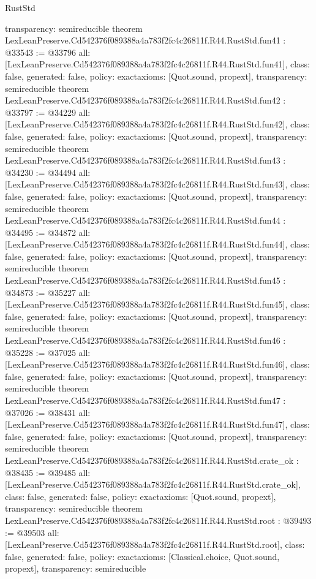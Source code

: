 \begin{lexlean}{RustStd}
\begin{coremodule}
{  transparency: semireducible
}
theorem LexLeanPreserve.Cd542376f089388a4a783f2fc4c26811f.R44.RustStd.fun41 : @33543 := @33796 {
  all: [LexLeanPreserve.Cd542376f089388a4a783f2fc4c26811f.R44.RustStd.fun41],
  class: false,
  generated: false,
  policy: exact{axioms: [Quot.sound, propext]},
  transparency: semireducible
}
theorem LexLeanPreserve.Cd542376f089388a4a783f2fc4c26811f.R44.RustStd.fun42 : @33797 := @34229 {
  all: [LexLeanPreserve.Cd542376f089388a4a783f2fc4c26811f.R44.RustStd.fun42],
  class: false,
  generated: false,
  policy: exact{axioms: [Quot.sound, propext]},
  transparency: semireducible
}
theorem LexLeanPreserve.Cd542376f089388a4a783f2fc4c26811f.R44.RustStd.fun43 : @34230 := @34494 {
  all: [LexLeanPreserve.Cd542376f089388a4a783f2fc4c26811f.R44.RustStd.fun43],
  class: false,
  generated: false,
  policy: exact{axioms: [Quot.sound, propext]},
  transparency: semireducible
}
theorem LexLeanPreserve.Cd542376f089388a4a783f2fc4c26811f.R44.RustStd.fun44 : @34495 := @34872 {
  all: [LexLeanPreserve.Cd542376f089388a4a783f2fc4c26811f.R44.RustStd.fun44],
  class: false,
  generated: false,
  policy: exact{axioms: [Quot.sound, propext]},
  transparency: semireducible
}
theorem LexLeanPreserve.Cd542376f089388a4a783f2fc4c26811f.R44.RustStd.fun45 : @34873 := @35227 {
  all: [LexLeanPreserve.Cd542376f089388a4a783f2fc4c26811f.R44.RustStd.fun45],
  class: false,
  generated: false,
  policy: exact{axioms: [Quot.sound, propext]},
  transparency: semireducible
}
theorem LexLeanPreserve.Cd542376f089388a4a783f2fc4c26811f.R44.RustStd.fun46 : @35228 := @37025 {
  all: [LexLeanPreserve.Cd542376f089388a4a783f2fc4c26811f.R44.RustStd.fun46],
  class: false,
  generated: false,
  policy: exact{axioms: [Quot.sound, propext]},
  transparency: semireducible
}
theorem LexLeanPreserve.Cd542376f089388a4a783f2fc4c26811f.R44.RustStd.fun47 : @37026 := @38431 {
  all: [LexLeanPreserve.Cd542376f089388a4a783f2fc4c26811f.R44.RustStd.fun47],
  class: false,
  generated: false,
  policy: exact{axioms: [Quot.sound, propext]},
  transparency: semireducible
}
theorem LexLeanPreserve.Cd542376f089388a4a783f2fc4c26811f.R44.RustStd.crate_ok : @38435 := @39485 {
  all: [LexLeanPreserve.Cd542376f089388a4a783f2fc4c26811f.R44.RustStd.crate_ok],
  class: false,
  generated: false,
  policy: exact{axioms: [Quot.sound, propext]},
  transparency: semireducible
}
theorem LexLeanPreserve.Cd542376f089388a4a783f2fc4c26811f.R44.RustStd.root : @39493 := @39503 {
  all: [LexLeanPreserve.Cd542376f089388a4a783f2fc4c26811f.R44.RustStd.root],
  class: false,
  generated: false,
  policy: exact{axioms: [Classical.choice, Quot.sound, propext]},
  transparency: semireducible
}


\end{coremodule}
\end{lexlean}
